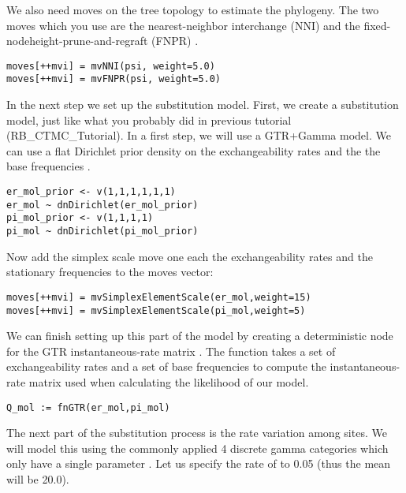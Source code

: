 We also need moves on the tree topology to estimate the phylogeny. The two moves which you use are the nearest-neighbor interchange (NNI) and the fixed-nodeheight-prune-and-regraft (FNPR) \citep{Hohna2012}.
{\tt \small \begin{snugshade*}
\begin{lstlisting}
moves[++mvi] = mvNNI(psi, weight=5.0)
moves[++mvi] = mvFNPR(psi, weight=5.0)\end{lstlisting}
\end{snugshade*}}


In the next step we set up the substitution model.
First, we create a substitution model, just like what you probably did in previous tutorial (\EG RB\_CTMC\_Tutorial). 
In a first step, we will use a GTR+Gamma model.
We can use a flat Dirichlet prior density on the exchangeability rates  and the the base frequencies .
{\tt \begin{snugshade*}
\begin{lstlisting}
er_mol_prior <- v(1,1,1,1,1,1) 
er_mol ~ dnDirichlet(er_mol_prior)
pi_mol_prior <- v(1,1,1,1) 
pi_mol ~ dnDirichlet(pi_mol_prior)
\end{lstlisting}
\end{snugshade*}}
Now add the simplex scale move one each the exchangeability rates  and the stationary frequencies  to the moves vector:
{\tt \small \begin{snugshade*}
\begin{lstlisting}
moves[++mvi] = mvSimplexElementScale(er_mol,weight=15) 
moves[++mvi] = mvSimplexElementScale(pi_mol,weight=5)  
\end{lstlisting}
\end{snugshade*}}
We can finish setting up this part of the model by creating a deterministic node for the GTR instantaneous-rate matrix . 
The  function takes a set of exchangeability rates and a set of base frequencies to compute the instantaneous-rate matrix used when calculating the likelihood of our model.
{\tt \begin{snugshade*}
\begin{lstlisting}
Q_mol := fnGTR(er_mol,pi_mol)
\end{lstlisting}
\end{snugshade*}}
The next part of the substitution process is the rate variation among sites. We will model this using the commonly applied 4 discrete gamma categories which only have a single parameter .
Let us specify the rate of  to 0.05 (thus the mean will be 20.0).
